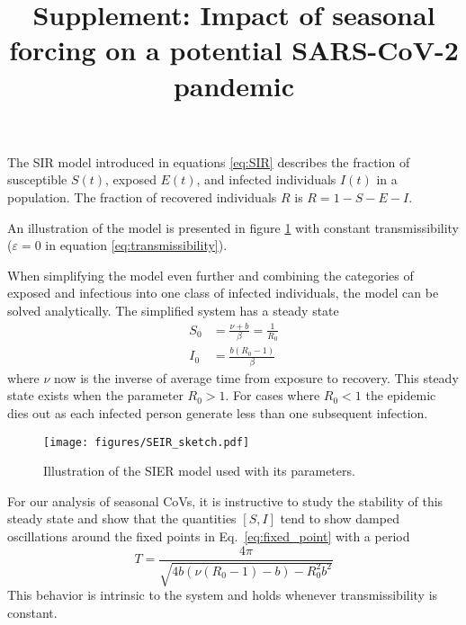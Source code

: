 \documentclass[rmp, reprint, superscriptaddress, floatfix,amsmath]{revtex4-1}
\newcommand{\forcing}{\varepsilon}
\begin{document}
\title{Supplement: Impact of seasonal forcing on a potential SARS-CoV-2 pandemic}

\setcounter{figure}{0}
\renewcommand{\figurename}{Figure S}
\setcounter{table}{0}
\renewcommand{\tablename}{Table S}
\maketitle
The SIR model introduced in equations \ref{eq:SIR} describes the fraction of susceptible $S(t)$, exposed $E(t)$, and infected individuals $I(t)$ in a population. 
The fraction of recovered individuals $R$ is $R=1 - S - E - I$. 

An illustration of the model is presented in figure \ref{fig:schemeSIR} with constant transmissibility ($\forcing=0$ in equation \ref{eq:transmissibility}).

When simplifying the model even further and combining the categories of exposed and infectious into one class of infected individuals, the model can be solved analytically.
The simplified system has a steady state
\begin{equation}
\begin{split}
S_0 &= \frac{\nu + b}{\beta} = \frac{1}{R_0} \\
I_0 & = \frac{b(R_0-1)}{\beta}
\end{split}
\label{eq:fixed_point}
\end{equation}
where $\nu$ now is the inverse of average time from exposure to recovery.
This steady state exists when the parameter $R_0 > 1$. For cases where $R_0 < 1$ the epidemic dies out as each infected person generate less than one subsequent infection. 

\begin{figure}[htb]
	\centering
	\texttt{[image: figures/SEIR\_sketch.pdf]}
	\caption{Illustration of the SIER model used with its parameters.}\label{fig:schemeSIR}
\end{figure}


For our analysis of seasonal CoVs, it is instructive to study the stability of this steady state and show that the quantities $[S,I]$ tend to show damped oscillations around the fixed points in Eq.~\ref{eq:fixed_point} with a period
\begin{equation}
T = \frac{4\pi}{\sqrt{4b(\nu(R_0-1) - b) - R_0^2b^2}}
\label{eq:period}
\end{equation}
This behavior is intrinsic to the system and holds whenever transmissibility is constant.
\end{document}
